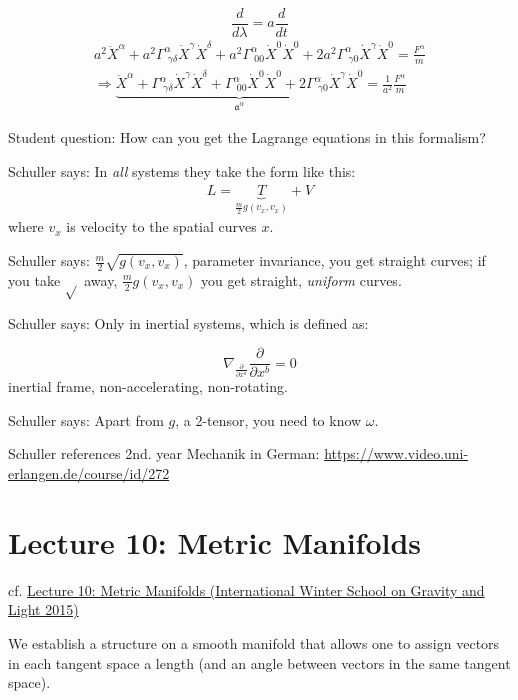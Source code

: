 \documentclass[10pt]{amsart}
\begin{document}
\begin{multicols*}{2}
	\[
	\frac{d}{d\lambda} = a \frac{d}{dt}
	\]
	\[
	\begin{gathered}
	a^2 \ddot{X}^{\alpha} + a^2 \Gamma^{\alpha}_{ \, \, \gamma \delta} \dot{X}^{\gamma} \dot{X}^{\delta} + a^2 \Gamma^{\alpha}_{ \, \, 00 } \dot{X}^0 \dot{X}^0 + 2a^2\Gamma^{\alpha}_{ \, \,\gamma 0} \dot{X}^{\gamma} \dot{X}^{0} =  \frac{ F^{\alpha}}{ m} \\
	\Longrightarrow  \underbrace{ \ddot{X}^{\alpha} +  \Gamma^{\alpha}_{ \, \, \gamma \delta} \dot{X}^{\gamma} \dot{X}^{\delta} +  \Gamma^{\alpha}_{ \, \, 00 } \dot{X}^0 \dot{X}^0 + 2\Gamma^{\alpha}_{ \, \,\gamma 0} \dot{X}^{\gamma} \dot{X}^{0} }_{\mathfrak{a}^{\alpha} } = \frac{1}{a^2} \frac{ F^{\alpha}}{ m} 
	\end{gathered}
	\]
	
Student question: How can you get the Lagrange equations in this formalism?

Schuller says: In \emph{all} systems they take the form like this:
\[
\begin{gathered}
L = \underbrace{T}_{\frac{m}{2} g(v_x, v_x)} + V
\end{gathered}
\]
where $v_x$ is velocity to the spatial curves $x$.

Schuller says: $\frac{m}{2} \sqrt{ g(v_x, v_x)}$, parameter invariance, you get straight curves; if you take $\sqrt{}$ away, $\frac{m}{2} g(v_x, v_x)$ you get straight, \emph{uniform} curves. 

Schuller says: Only in inertial systems, which is defined as:

\[
\boxed{ \nabla_{\frac{ \partial }{ \partial x^a} } \frac{\partial }{ \partial x^b} = 0 }
\]
inertial frame, non-accelerating, non-rotating.

Schuller says: Apart from $g$, a 2-tensor, you need to know $\omega$.
	
Schuller references 2nd. year Mechanik in German: \url{https://www.video.uni-erlangen.de/course/id/272}

	
	\section{Lecture 10: Metric Manifolds}
	
	cf. \href{https://youtu.be/ONCZNwKswn4}{Lecture 10: Metric Manifolds (International Winter School on Gravity and Light 2015)}
	
	We establish a structure on a smooth manifold that allows one to assign vectors in each tangent space a length (and an angle between vectors in the same tangent space).
	

\end{multicols*}
\end{document}
